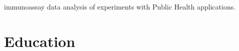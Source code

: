 \documentclass[margin,line]{res}
\begin{document}
\begin{resume}
 immunoassay data analysis of experiments with Public Health applications.\\




\section{\sc Education}


\end{resume}
\end{document}

